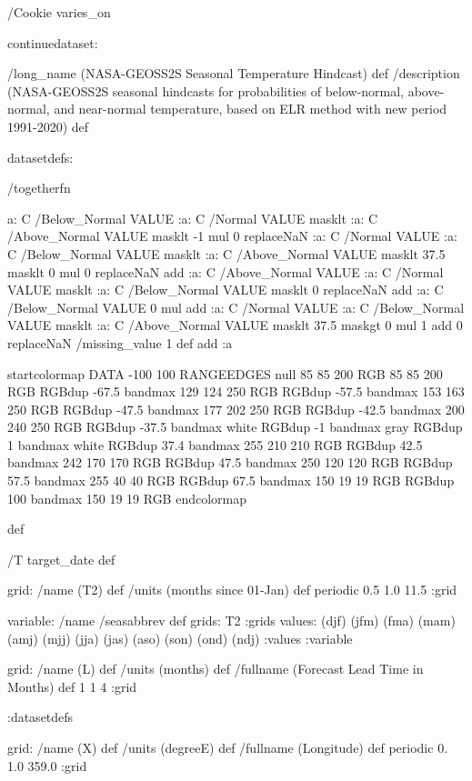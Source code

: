 \begin{ingrid}

/Cookie varies_on

continuedataset:

/long_name (NASA-GEOSS2S Seasonal Temperature Hindcast) def
/description (NASA-GEOSS2S seasonal hindcasts for probabilities of below-normal, above-normal, and near-normal temperature, based on ELR method with new period 1991-2020) def

datasetdefs:

/togetherfn {
 a:
    C /Below_Normal VALUE
    :a:
     C /Normal VALUE
     masklt
    :a:
     C /Above_Normal VALUE
     masklt
    -1 mul
    0 replaceNaN
    :a:
     C /Normal VALUE
     :a:
      C /Below_Normal VALUE
      masklt
     :a:
      C /Above_Normal VALUE
      masklt
     37.5 masklt
     0 mul
     0 replaceNaN           
     add
    :a:
     C /Above_Normal VALUE
     :a:
      C /Normal VALUE
      masklt
     :a:
      C /Below_Normal VALUE
      masklt
     0 replaceNaN
     add
 :a:
     C /Below_Normal VALUE
     0 mul
     add
    :a:
     C /Normal VALUE
     :a:
      C /Below_Normal VALUE
      masklt
     :a:
      C /Above_Normal VALUE        
      masklt
     37.5 maskgt
     0 mul
     1 add
     0 replaceNaN
     /missing_value 1 def
     add
    :a

startcolormap
DATA -100 100 RANGEEDGES
null 85 85 200 RGB
85 85 200 RGB RGBdup -67.5 bandmax
129 124 250 RGB RGBdup -57.5 bandmax
153 163 250 RGB RGBdup -47.5 bandmax
177 202 250 RGB RGBdup -42.5 bandmax
200 240 250 RGB RGBdup -37.5 bandmax
white RGBdup -1 bandmax
gray RGBdup 1 bandmax
white RGBdup 37.4 bandmax
255 210 210 RGB RGBdup 42.5 bandmax
242 170 170 RGB RGBdup 47.5 bandmax
250 120 120 RGB RGBdup 57.5 bandmax
255 40 40 RGB RGBdup 67.5 bandmax
150 19 19 RGB RGBdup 100 bandmax
150 19 19 RGB
endcolormap
} def 

/T {target_date} def

grid:
/name (T2) def
/units (months since 01-Jan) def
periodic
0.5 1.0 11.5
:grid

variable:
/name /seasabbrev def
grids: T2 :grids
values: (djf) (jfm) (fma) (mam) (amj) (mjj) (jja) (jas) (aso) (son) (ond) (ndj) :values
:variable

 grid:
 /name (L) def
 /units (months) def
 /fullname (Forecast Lead Time in Months) def
 1 1 4
 :grid

:datasetdefs

grid:
/name (X) def
/units (degreeE) def
/fullname (Longitude) def
periodic
0. 1.0 359.0
:grid


\end{ingrid}
